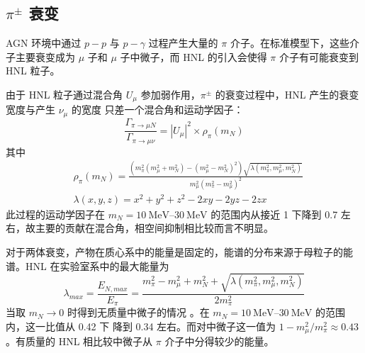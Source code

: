 \documentclass[printMode=false, declarePage=false]{ecnuthesis}
\begin{document}
\subsection{$\pi^\pm$ 衰变}
AGN 环境中通过 $p - p$ 与 $p - \gamma$ 过程产生大量的 $\pi$ 介子。在标准模型下，这些介子主要衰变成为 $\mu$ 子和 $\mu$ 子中微子，而 HNL
的引入会使得 $\pi$ 介子有可能衰变到 HNL 粒子。
\begin{center}
\end{center}
由于 HNL 粒子通过混合角 $U_{\mu}$ 参加弱作用，$\pi^\pm$ 的衰变过程中，HNL 产生的衰变宽度与产生 $\nu_\mu$ 的宽度
只差一个混合角和运动学因子：
\begin{equation}
  \frac{\Gamma_{\pi \to \mu N}}{\Gamma_{\pi \to \mu \nu}} =
  |U_{\mu}|^2 \times \rho_\pi (m_N) \label{eq:pion_HNL_rho}
\end{equation}
其中
\begin{align}
   & \rho_\pi (m_N) = \frac{(m_\pi^2 (m_\mu^2 + m_N^2) - (m_\mu^2 - m_N^2)^2) \sqrt{\lambda(m_\pi^2, m_\mu^2, m_N^2)}}{m_\mu^2 (m_\pi^2 - m_\mu^2)^2} \label{eq:rho_pi} \\
   & \lambda(x, y, z) = x^2 + y^2 + z^2 - 2xy - 2yz - 2zx
\end{align}
此过程的运动学因子在 $m_N = \qtyrange{10}{30}{\mega\electronvolt}$ 的范围内从接近 1 下降到 0.7 左右，故主要的贡献在混合角，相空间抑制相比较而言不明显。

对于两体衰变，产物在质心系中的能量是固定的，能谱的分布来源于母粒子的能谱。HNL 在实验室系中的最大能量为
\begin{equation}
  \lambda_{max} = \frac{E_{N,max}}{E_\pi} = \frac{m_\pi^2 - m_\mu^2 + m_N^2 + \sqrt{\lambda(m_\pi^2, m_\mu^2, m_N^2)}}{2 m_\pi^2}
\end{equation}
当取 $m_N \to 0$ 时得到无质量中微子的情况 \cite{kelner2006energy}。在 $m_N = \qtyrange{10}{30}{\mega\electronvolt}$ 的范围内，这一比值从 0.42 下
降到 0.34 左右。而对中微子这一值为 $1 - m_\mu^2 / m_\pi^2 \approx 0.43$。有质量的 HNL 相比较中微子从 $\pi$ 介子中分得较少的能量。
\end{document}

